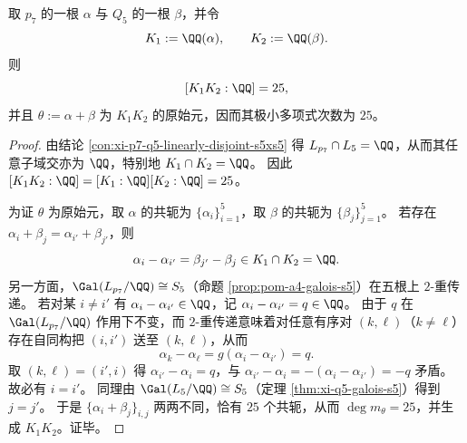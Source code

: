 \begin{theorem}[两个五次域的合成次数与原始元]\label{thm:xi-p7-q5-primitive-element-degree25}
取 \(p_7\) 的一根 \(\alpha\) 与 \(Q_5\) 的一根 \(\beta\)，并令
\[
K_1:=\QQ(\alpha),\qquad K_2:=\QQ(\beta).
\]
则
\[
[K_1K_2:\QQ]=25,
\]
并且 \(\theta:=\alpha+\beta\) 为 \(K_1K_2\) 的原始元，因而其极小多项式次数为 \(25\)。
\end{theorem}
\begin{proof}
由结论 \ref{con:xi-p7-q5-linearly-disjoint-s5xs5} 得 \(L_{p_7}\cap L_5=\QQ\)，从而其任意子域交亦为 \(\QQ\)，特别地 \(K_1\cap K_2=\QQ\)。
因此
\(
[K_1K_2:\QQ]=[K_1:\QQ][K_2:\QQ]=25
\)。
\par
为证 \(\theta\) 为原始元，取 \(\alpha\) 的共轭为 \(\{\alpha_i\}_{i=1}^5\)，取 \(\beta\) 的共轭为 \(\{\beta_j\}_{j=1}^5\)。
若存在
\(
\alpha_i+\beta_j=\alpha_{i'}+\beta_{j'}
\)，则
\[
\alpha_i-\alpha_{i'}=\beta_{j'}-\beta_j\in K_1\cap K_2=\QQ.
\]
另一方面，\(\Gal(L_{p_7}/\QQ)\cong S_5\)（命题 \ref{prop:pom-a4-galois-s5}）在五根上 \(2\)-重传递。
若对某 \(i\neq i'\) 有 \(\alpha_i-\alpha_{i'}\in\QQ\)，记 \(\alpha_i-\alpha_{i'}=q\in\QQ\)。
由于 \(q\) 在 \(\Gal(L_{p_7}/\QQ)\) 作用下不变，而 \(2\)-重传递意味着对任意有序对 \((k,\ell)\)（\(k\neq \ell\)）存在自同构把 \((i,i')\) 送至 \((k,\ell)\)，从而
\[
\alpha_k-\alpha_\ell=g(\alpha_i-\alpha_{i'})=q.
\]
取 \((k,\ell)=(i',i)\) 得 \(\alpha_{i'}-\alpha_i=q\)，与 \(\alpha_{i'}-\alpha_i=-(\alpha_i-\alpha_{i'})=-q\) 矛盾。
故必有 \(i=i'\)。
同理由 \(\Gal(L_5/\QQ)\cong S_5\)（定理 \ref{thm:xi-q5-galois-s5}）得到 \(j=j'\)。
于是 \(\{\alpha_i+\beta_j\}_{i,j}\) 两两不同，恰有 \(25\) 个共轭，从而 \(\deg m_\theta=25\)，并生成 \(K_1K_2\)。证毕。
\end{proof}


